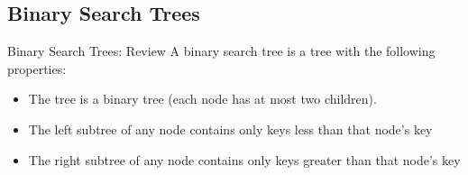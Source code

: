 \documentclass[9pt]{beamer}
\begin{document}
\subsection{Binary Search Trees}
\begin{frame}[fragile]{Binary Search Trees: Review}
  A binary search tree is a tree with the following properties:
  \begin{itemize}
    \item
      The tree is a binary tree (each node has at most two children).
    \item
      The left subtree of any node contains only keys less than that node's
      key
    \item
      The right subtree of any node contains only keys greater than that
      node's key
  \end{itemize}

\end{frame}
\end{document}
